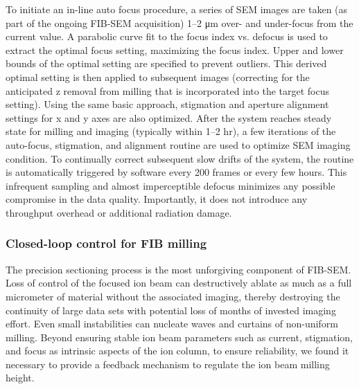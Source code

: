 \documentclass{article}
\begin{document}
To initiate an in-line auto focus procedure, a series of SEM images are taken (as part of the ongoing FIB-SEM acquisition) 1–2 μm over- and under-focus from the current value. A parabolic curve fit to the focus index vs. defocus is used to extract the optimal focus setting, maximizing the focus index. Upper and lower bounds of the optimal setting are specified to prevent outliers. This derived optimal setting is then applied to subsequent images (correcting for the anticipated z removal from milling that is incorporated into the target focus setting). Using the same basic approach, stigmation and aperture alignment settings for x and y axes are also optimized. After the system reaches steady state for milling and imaging (typically within 1–2 hr), a few iterations of the auto-focus, stigmation, and alignment routine are used to optimize SEM imaging condition. To continually correct subsequent slow drifts of the system, the routine is automatically triggered by software every 200 frames or every few hours. This infrequent sampling and almost imperceptible defocus minimizes any possible compromise in the data quality. Importantly, it does not introduce any throughput overhead or additional radiation damage.

\subsubsection*{Closed-loop control for FIB milling}

The precision sectioning process is the most unforgiving component of FIB-SEM. Loss of control of the focused ion beam can destructively ablate as much as a full micrometer of material without the associated imaging, thereby destroying the continuity of large data sets with potential loss of months of invested imaging effort. Even small instabilities can nucleate waves and curtains of non-uniform milling. Beyond ensuring stable ion beam parameters such as current, stigmation, and focus as intrinsic aspects of the ion column, to ensure reliability, we found it necessary to provide a feedback mechanism to regulate the ion beam milling height.
\end{document}

